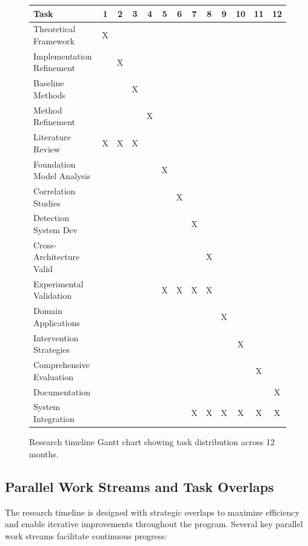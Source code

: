 \documentclass[11pt, oneside]{book}
\theoremstyle{plain}
\theoremstyle{definition}
\theoremstyle{remark}
\begin{document}
\begin{figure}[htbp]
\centering
\small
\begin{tabular}{|l|c|c|c|c|c|c|c|c|c|c|c|c|}
\hline
\textbf{Task} & \textbf{1} & \textbf{2} & \textbf{3} & \textbf{4} & \textbf{5} & \textbf{6} & \textbf{7} & \textbf{8} & \textbf{9} & \textbf{10} & \textbf{11} & \textbf{12} \\
\hline
Theoretical Framework & X & & & & & & & & & & & \\
\hline
Implementation Refinement & & X & & & & & & & & & & \\
\hline
Baseline Methods & & & X & & & & & & & & & \\
\hline
Method Refinement & & & & X & & & & & & & & \\
\hline
Literature Review & X & X & X & & & & & & & & & \\
\hline
Foundation Model Analysis & & & & & X & & & & & & & \\
\hline
Correlation Studies & & & & & & X & & & & & & \\
\hline
Detection System Dev & & & & & & & X & & & & & \\
\hline
Cross-Architecture Valid & & & & & & & & X & & & & \\
\hline
Experimental Validation & & & & & X & X & X & X & & & & \\
\hline
Domain Applications & & & & & & & & & X & & & \\
\hline
Intervention Strategies & & & & & & & & & & X & & \\
\hline
Comprehensive Evaluation & & & & & & & & & & & X & \\
\hline
Documentation & & & & & & & & & & & & X \\
\hline
System Integration & & & & & & & X & X & X & X & X & X \\
\hline
\end{tabular}
\caption{Research timeline Gantt chart showing task distribution across 12 months.}
\label{fig:gantt_chart}
\end{figure}

\subsection{Parallel Work Streams and Task Overlaps}

The research timeline is designed with strategic overlaps to maximize efficiency and enable iterative improvements throughout the program. Several key parallel work streams facilitate continuous progress:
\end{document}
